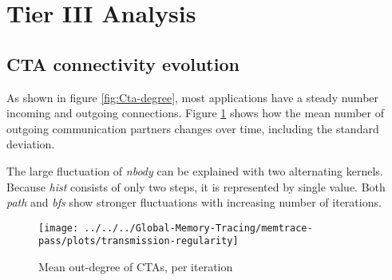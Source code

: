 \section{Tier III Analysis}

\subsection{CTA connectivity evolution}
As shown in figure \ref{fig:Cta-degree}, most applications have a steady number incoming and outgoing connections. Figure \ref{philandering} shows how the mean number of outgoing communication partners changes over time, including the standard deviation. 

The large fluctuation of \textit{nbody} can be explained with two alternating kernels. Because \textit{hist} consists of only two steps, it is represented by single value. Both \textit{path} and \textit{bfs} show stronger fluctuations with increasing number of iterations.

\begin{figure}[h!]
	\centering
		\texttt{[image: ../../../Global-Memory-Tracing/memtrace-pass/plots/transmission-regularity]}
	\caption{Mean out-degree of CTAs, per iteration}
	\label{philandering}
\end{figure}